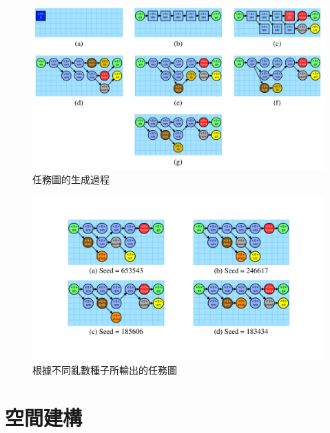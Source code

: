 \begin{figure}[!htb]
  \begin{center}
    \includegraphics[width=1.0\textwidth]{figures/mission-graph-generating-progress.pdf}
    \caption{任務圖的生成過程}
    \label{fig:mission-graph-generating-progress}
  \end{center}
\end{figure}

\begin{figure}[!htb]
  \begin{center}
    \includegraphics[width=1.0\textwidth]{figures/final-mission-graph.pdf}
    \caption{根據不同亂數種子所輸出的任務圖}
    \label{fig:final-mission-graph}
  \end{center}
\end{figure}

\clearpage

\section{空間建構}
\label{sec:method-spacepieces}

